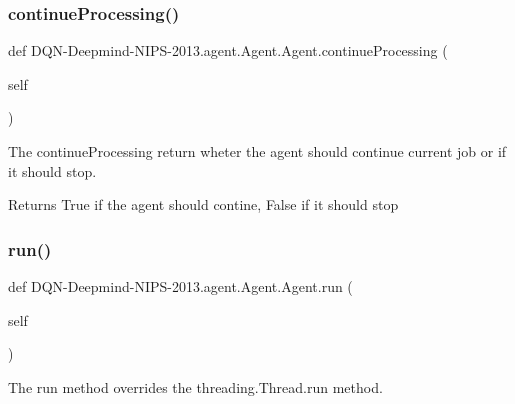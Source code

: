 \subsubsection{\texorpdfstring{continue\+Processing()}{continueProcessing()}}
{\footnotesize\ttfamily def D\+QN-\/Deepmind-\/N\+I\+PS-\/2013.agent.\+Agent.\+Agent.\+continue\+Processing (\begin{DoxyParamCaption}\item[{}]{self }\end{DoxyParamCaption})}



The continue\+Processing return wheter the agent should continue current job or if it should stop. 

\begin{DoxyReturn}{Returns}
True if the agent should contine, False if it should stop 
\end{DoxyReturn}
\hypertarget{classDQN-Deepmind-NIPS-2013_1_1agent_1_1Agent_1_1Agent_ae41ae14645afb3279112e9d02991be99}{}\label{classDQN-Deepmind-NIPS-2013_1_1agent_1_1Agent_1_1Agent_ae41ae14645afb3279112e9d02991be99} 
\subsubsection{\texorpdfstring{run()}{run()}}
{\footnotesize\ttfamily def D\+QN-\/Deepmind-\/N\+I\+PS-\/2013.agent.\+Agent.\+Agent.\+run (\begin{DoxyParamCaption}\item[{}]{self }\end{DoxyParamCaption})}



The run method overrides the threading.\+Thread.\+run method. 

\hypertarget{classDQN-Deepmind-NIPS-2013_1_1agent_1_1Agent_1_1Agent_a1662a18fd255f7c6e7a696ad4dd45304}{}\label{classDQN-Deepmind-NIPS-2013_1_1agent_1_1Agent_1_1Agent_a1662a18fd255f7c6e7a696ad4dd45304} 
